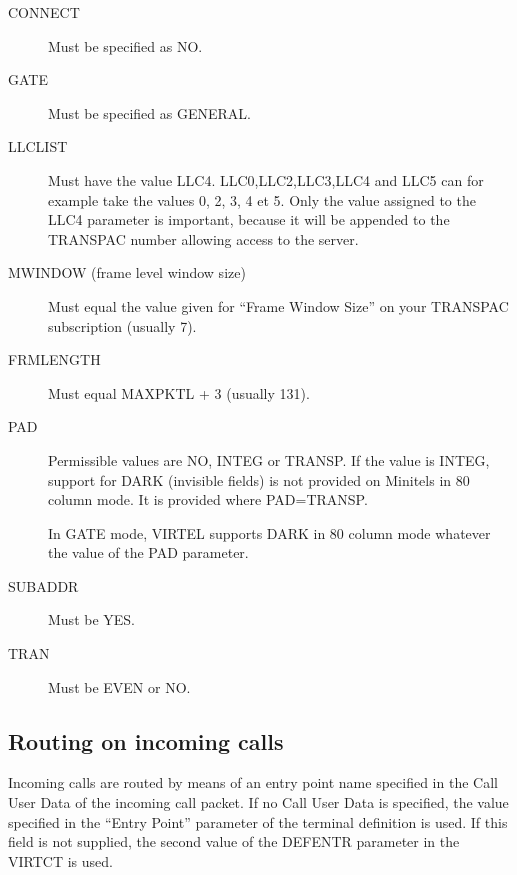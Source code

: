 \documentclass[letterpaper,10pt,english]{sphinxmanual}
\begin{document}
\begin{description}
\item[{CONNECT}] \leavevmode
Must be specified as NO.

\item[{GATE}] \leavevmode
Must be specified as GENERAL.

\item[{LLCLIST}] \leavevmode
Must have the value LLC4. LLC0,LLC2,LLC3,LLC4 and LLC5 can for example take the values 0, 2, 3, 4 et 5. Only the value assigned to the LLC4 parameter is important, because it will be appended to the TRANSPAC number allowing access to the server.

\item[{MWINDOW (frame level window size)}] \leavevmode
Must equal the value given for “Frame Window Size” on your TRANSPAC subscription (usually 7).

\item[{FRMLENGTH}] \leavevmode
Must equal MAXPKTL + 3 (usually 131).

\item[{PAD}] \leavevmode
Permissible values are NO, INTEG or TRANSP. If the value is INTEG, support for DARK (invisible fields) is not provided on Minitels in
80 column mode. It is provided where PAD=TRANSP.

In GATE mode, VIRTEL supports DARK in 80 column mode whatever the value of the PAD parameter.

\item[{SUBADDR}] \leavevmode
Must be YES.

\item[{TRAN}] \leavevmode
Must be EVEN or NO.

\end{description}

\ignorespaces 

\subsection{Routing on incoming calls}
\label{\detokenize{connectivity_guide:routing-on-incoming-calls}}\label{\detokenize{connectivity_guide:index-67}}
Incoming calls are routed by means of an entry point name specified in the Call User Data of the incoming call packet. If no Call User Data is specified, the value specified in the “Entry Point” parameter of the terminal definition is used. If this field is not supplied, the second value of the DEFENTR parameter in the VIRTCT is used.
\end{document}
